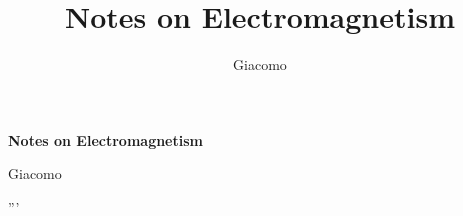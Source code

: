 \documentclass{article}
\title{Notes on Electromagnetism}
\author{Giacomo}
\begin{document}
\begin{titlepage}
    

    \centering
    {\Huge\bfseries Notes on Electromagnetism\par}
    \vspace{1.5cm}
    {\large Giacomo\par}
\end{titlepage}







'''

\end{document}

